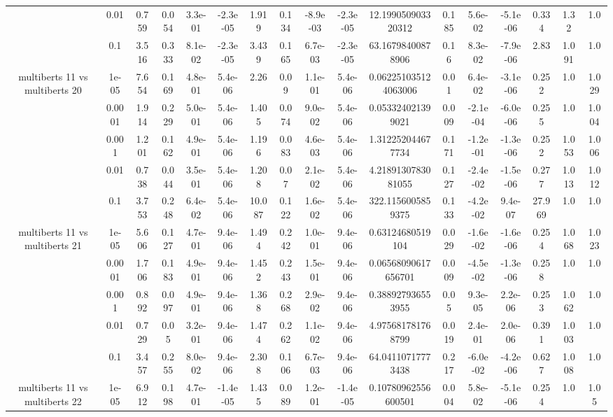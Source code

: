 \begin{tabular}{|c|c|c|c|c|c|c|c|c|c|c|c|c|c|c|c|c|}
 & 0.01 & 0.759 & 0.054 & 3.3e-01 & -2.3e-05 & 1.919 & 0.134 & -8.9e-03 & -2.3e-05 & 12.199050903320312 & 0.185 & 5.6e-02 & -5.1e-06 & 0.334 & 1.32 & 1.0 \\
 & 0.1 & 3.516 & 0.333 & 8.1e-02 & -2.3e-05 & 3.439 & 0.165 & 6.7e-03 & -2.3e-05 & 63.16798400878906 & 0.16 & 8.3e-02 & -7.9e-06 & 2.83 & 1.091 & 1.0 \\
\hline
\multirow{5}{*}{multiberts 11 vs multiberts 20} & 1e-05 & 7.654 & 0.169 & 4.8e-01 & 5.4e-06 & 2.26 & 0.09 & 1.1e-01 & 5.4e-06 & 0.062251035124063006 & 0.01 & 6.4e-02 & -3.1e-06 & 0.252 & 1.0 & 1.029 \\
 & 0.0001 & 1.914 & 0.229 & 5.0e-01 & 5.4e-06 & 1.405 & 0.074 & 9.0e-02 & 5.4e-06 & 0.053324021399021 & 0.009 & -2.1e-04 & -6.0e-06 & 0.255 & 1.0 & 1.004 \\
 & 0.001 & 1.201 & 0.162 & 4.9e-01 & 5.4e-06 & 1.196 & 0.083 & 4.6e-03 & 5.4e-06 & 1.312252044677734 & 0.171 & -1.2e-01 & -1.3e-06 & 0.252 & 1.053 & 1.006 \\
 & 0.01 & 0.738 & 0.044 & 3.5e-01 & 5.4e-06 & 1.208 & 0.07 & 2.1e-02 & 5.4e-06 & 4.2189130783081055 & 0.127 & -2.4e-02 & -1.5e-06 & 0.277 & 1.013 & 1.012 \\
 & 0.1 & 3.753 & 0.248 & 6.4e-02 & 5.4e-06 & 10.087 & 0.122 & 1.6e-02 & 5.4e-06 & 322.1156005859375 & 0.133 & -4.2e-02 & 9.4e-07 & 27.969 & 1.0 & 1.0 \\
\hline
\multirow{5}{*}{multiberts 11 vs multiberts 21} & 1e-05 & 5.606 & 0.127 & 4.7e-01 & 9.4e-06 & 1.494 & 0.242 & 1.0e-01 & 9.4e-06 & 0.63124680519104 & 0.029 & -1.6e-02 & -1.6e-06 & 0.254 & 1.068 & 1.023 \\
 & 0.0001 & 1.706 & 0.183 & 4.9e-01 & 9.4e-06 & 1.452 & 0.243 & 1.5e-01 & 9.4e-06 & 0.06568090617656701 & 0.009 & -4.5e-02 & -1.3e-06 & 0.258 & 1.0 & 1.0 \\
 & 0.001 & 0.892 & 0.097 & 4.9e-01 & 9.4e-06 & 1.368 & 0.268 & 2.9e-02 & 9.4e-06 & 0.388927936553955 & 0.05 & 9.3e-05 & 2.2e-06 & 0.253 & 1.062 & 1.0 \\
 & 0.01 & 0.729 & 0.05 & 3.2e-01 & 9.4e-06 & 1.474 & 0.262 & 1.1e-02 & 9.4e-06 & 4.975681781768799 & 0.019 & 2.4e-01 & 2.0e-06 & 0.391 & 1.003 & 1.0 \\
 & 0.1 & 3.457 & 0.255 & 8.0e-02 & 9.4e-06 & 2.308 & 0.106 & 6.7e-03 & 9.4e-06 & 64.04110717773438 & 0.217 & -6.0e-02 & -4.2e-06 & 0.627 & 1.008 & 1.0 \\
\hline
\multirow{5}{*}{multiberts 11 vs multiberts 22} & 1e-05 & 6.912 & 0.198 & 4.7e-01 & -1.4e-05 & 1.435 & 0.089 & 1.2e-01 & -1.4e-05 & 0.10780962556600501 & 0.004 & 5.8e-02 & -5.1e-06 & 0.254 & 1.0 & 1.05 \\

\end{tabular}
